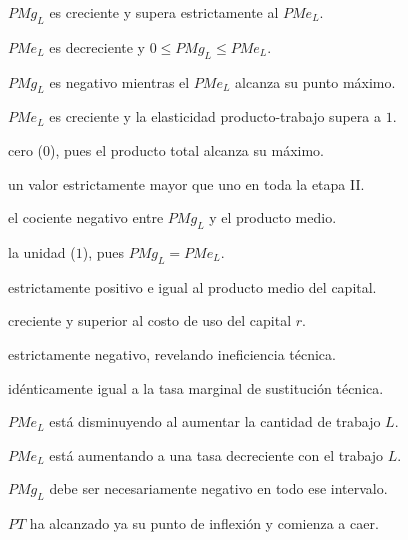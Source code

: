 \begin{opts}
    \item $PMg_L$ es creciente y supera estrictamente al $PMe_L$.
    \item $PMe_L$ es decreciente y $0 \le PMg_L \le PMe_L$.
    \item $PMg_L$ es negativo mientras el $PMe_L$ alcanza su punto máximo.
    \item $PMe_L$ es creciente y la elasticidad producto-trabajo supera a $1$.
\end{opts}

\begin{opts}
    \item cero ($0$), pues el producto total alcanza su máximo.
    \item un valor estrictamente mayor que uno en toda la etapa II.
    \item el cociente negativo entre $PMg_L$ y el producto medio.
    \item la unidad ($1$), pues $PMg_L = PMe_L$.
\end{opts}

\begin{opts}
    \item estrictamente positivo e igual al producto medio del capital.
    \item creciente y superior al costo de uso del capital $r$.
    \item estrictamente negativo, revelando ineficiencia técnica.
    \item idénticamente igual a la tasa marginal de sustitución técnica.
\end{opts}

\begin{opts}
    \item $PMe_L$ está disminuyendo al aumentar la cantidad de trabajo $L$.
    \item $PMe_L$ está aumentando a una tasa decreciente con el trabajo $L$.
    \item $PMg_L$ debe ser necesariamente negativo en todo ese intervalo.
    \item $PT$ ha alcanzado ya su punto de inflexión y comienza a caer.
\end{opts}

